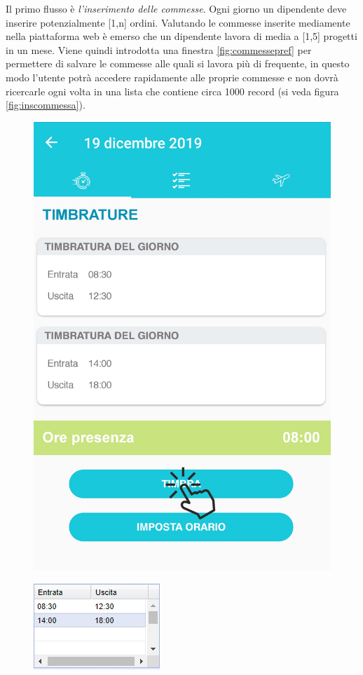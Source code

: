 \documentclass[12pt]{report}
\begin{document}
Il primo flusso è \textit{l'inserimento delle commesse}. Ogni giorno un dipendente deve inserire potenzialmente [1,n] ordini. Valutando le commesse inserite mediamente nella piattaforma web è emerso che un dipendente lavora di media a [1,5] progetti in un mese. Viene quindi introdotta una finestra \ref{fig:commessepref} per permettere di salvare le commesse alle quali si lavora più di frequente, in questo modo l'utente potrà accedere rapidamente alle proprie commesse e non dovrà ricercarle ogni volta in una lista che contiene circa 1000 record (si veda figura \ref{fig:inscommessa}).
\newpage
\begin{multicols}{2}
	\begin{figure}[H]
		\centering
	\includegraphics[width=0.7\linewidth]{immagini/timbra}
	\caption{}
	\label{fig:commessetimbra}
	\end{figure}
	\begin{figure}[H]
		\centering
	\includegraphics[width=0.6\linewidth]{immagini/inserimento orario}
	\caption{}
	\label{fig:insorario}
	\end{figure}
\end{multicols}
\end{document}
